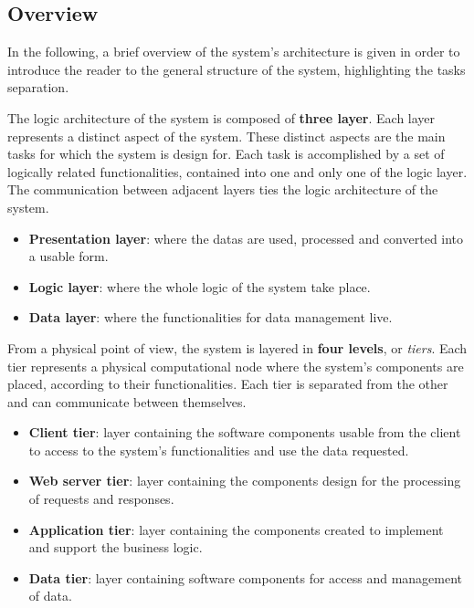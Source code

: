 \subsection{Overview}

In the following, a brief overview of the system's architecture is given in order to introduce the reader to the general structure of the system, highlighting the tasks separation.

The logic architecture of the system is composed of \textbf{three layer}. Each layer represents a distinct aspect of the system. These distinct aspects are the main tasks for which the system is design for. Each task is accomplished by a set of logically related functionalities, contained into one and only one of the logic layer. The communication between adjacent layers ties the logic architecture of the system. 

\begin{itemize}
	\item \textbf{Presentation layer}: where the datas are used, processed and converted into a usable form.
	\item \textbf{Logic layer}: where the whole logic of the system take place.
	\item \textbf{Data layer}: where the functionalities for data management live.
\end{itemize}

From a physical point of view, the system is layered in \textbf{four levels}, or \textit{tiers}. Each tier represents a physical computational node where the system's components are placed, according to their functionalities. Each tier is separated from the other and can communicate between themselves.

\begin{itemize}
	\item \textbf{Client tier}: layer containing the software components usable from the client to access to the system's functionalities and use the data requested.
	\item \textbf{Web server tier}: layer containing the components design for the processing of requests and responses.
	\item \textbf{Application tier}: layer containing the components created to implement and support the business logic.
	\item \textbf{Data tier}: layer containing software components for access and management of data.
\end{itemize}

